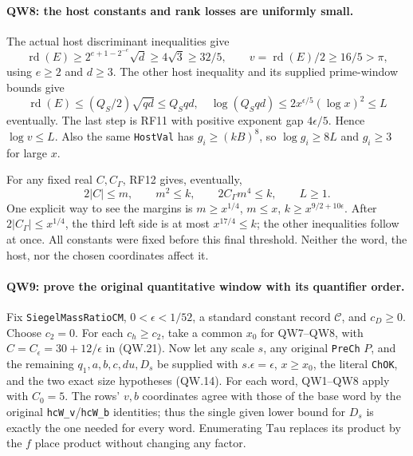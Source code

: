 \paragraph{QW8: the host constants and rank losses are uniformly small.}
The actual host discriminant inequalities give
\[
 \operatorname{rd}(E)\ge
 2^{e+1-2^{-e}}\sqrt d\ge4\sqrt3\ge32/5,
 \qquad v=\operatorname{rd}(E)/2\ge16/5>\pi,
\]
using $e\ge2$ and $d\ge3$. The other host inequality and its supplied
prime-window bounds give
\[
 \operatorname{rd}(E)\le(Q_S/2)\sqrt{q d}\le Q_S qd,
 \quad \log(Q_S qd)\le2x^{\epsilon/5}(\log x)^2\le L
\]
eventually. The last step is RF11 with positive exponent gap
$4\epsilon/5$. Hence $\log v\le L$.
Also the same \texttt{HostVal} has $g_i\ge(kB)^8$, so
$\log g_i\ge8L$ and $g_i\ge3$ for large $x$.

For any fixed real $C,C_\Gamma$, RF12 gives, eventually,
\[
      2|C|\le m,\qquad m^2\le k,\qquad 2C_\Gamma m^4\le k,
      \qquad L\ge1.                                           \tag{QW.21}
\]
One explicit way to see the margins is
$m\ge x^{1/4}$, $m\le x$, $k\ge x^{9/2+10\epsilon}$.
After $2|C_\Gamma|\le x^{1/4}$, the third left side is at most
$x^{17/4}\le k$; the other inequalities follow at once.
All constants were fixed before this final threshold. Neither the word,
the host, nor the chosen coordinates affect it.

\paragraph{QW9: prove the original quantitative window with its quantifier order.}
Fix \texttt{SiegelMassRatioCM}, $0<\epsilon<1/52$, a standard constant
record $\mathcal C$, and $c_D\ge0$. Choose $c_2=0$. For each
$c_h\ge c_2$, take a common $x_0$ for QW7--QW8, with
$C=C_\epsilon=30+12/\epsilon$ in (QW.21). Now let any scale $s$,
any original \texttt{PreCh} $P$, and the remaining $q_1,a,b,c,du,D_s$
be supplied with $s.\epsilon=\epsilon$, $x\ge x_0$, the literal
\texttt{ChOK}, and the two exact size hypotheses (QW.14).
For each word, QW1--QW8 apply with $C_0=5$.
The rows' $v,b$ coordinates agree with those of the base word by the
original \texttt{hcW\_v}/\texttt{hcW\_b} identities; thus the single
given lower bound for $D_s$ is exactly the one needed for every word.
Enumerating $\mathrm{Tau}$ replaces its product by the $f$ place product
without changing any factor.

